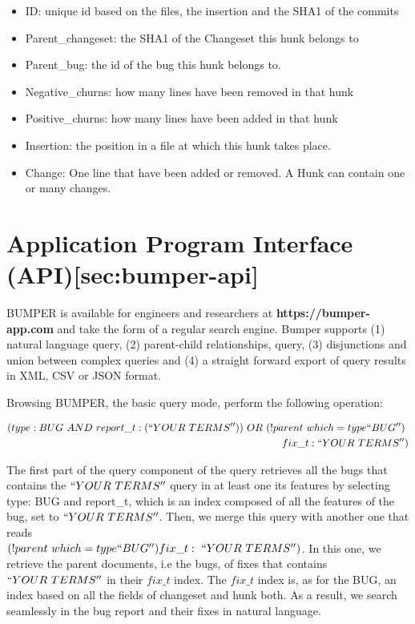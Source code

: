 \begin{itemize}
\item
  ID: unique id based on the files, the insertion and the SHA1 of the
  commits
\item
  Parent\_changeset: the SHA1 of the Changeset this hunk belongs to
\item
  Parent\_bug: the id of the bug this hunk belongs to.
\item
  Negative\_churns: how many lines have been removed in that hunk
\item
  Positive\_churns: how many lines have been added in that hunk
\item
  Insertion: the position in a file at which this hunk takes place.
\item
  Change: One line that have been added or removed. A Hunk can contain
  one or many changes.
\end{itemize}

\section{Application Program Interface
(API){[}sec:bumper-api{]}}\label{application-program-interface-apisecbumper-api}

BUMPER is available for engineers and researchers at
{\textbf{https://bumper-app.com}} and take the form of a regular search
engine. Bumper supports (1) natural language query, (2) parent-child
relationships, query, (3) disjunctions and union between complex queries
and (4) a straight forward export of query results in XML, CSV or JSON
format.

Browsing BUMPER, the basic query mode, perform the following operation:

\[\begin{split}
(type:BUG~AND~report\_t:(``YOUR~TERMS''))~OR~(!parent~which=type``BUG'')~\\fix\_t:``YOUR~TERMS'')
\end{split}\]

The first part of the query component of the query retrieves all the
bugs that contains the \(``YOUR~TERMS''\) query in at least one its
features by selecting type: BUG and report\_t, which is an index
composed of all the features of the bug, set to \(``YOUR~TERMS''\).
Then, we merge this query with another one that reads\\
\((!parent~which=type``BUG'')fix\_t:~``YOUR~TERMS'')\). In this one, we
retrieve the parent documents, i.e the bugs, of fixes that contains
\(``YOUR~TERMS''\) in their \(fix\_t\) index. The \(fix\_t\) index is,
as for the BUG, an index based on all the fields of changeset and hunk
both. As a result, we search seamlessly in the bug report and their
fixes in natural language.

